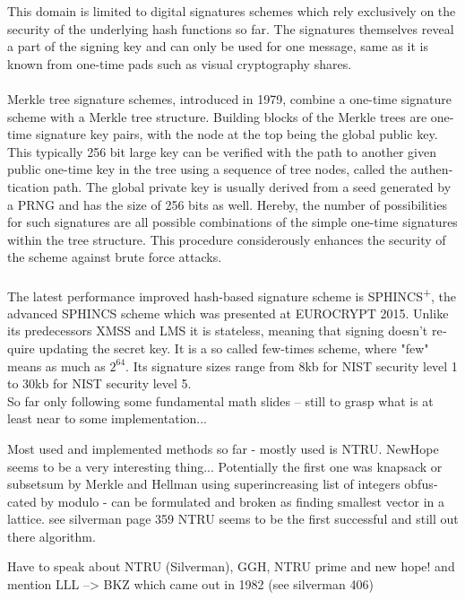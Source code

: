 \documentclass[a4paper,11pt,draft]{article}
\begin{document}
\begin{otherlanguage}{english}
\begin{multicols}{2}
This domain is limited to digital signatures schemes which rely exclusively on the security of the underlying hash functions so far. The signatures themselves reveal a part of the signing key and can only be used for one message, same as it is known from one-time pads such as visual cryptography shares. \\
\\
Merkle tree signature schemes, introduced in 1979, combine a one-time signature scheme with a Merkle tree structure. Building blocks of the Merkle trees are one-time signature key pairs, with the node at the top being the global public key. This typically 256 bit large key can be verified with the path to another given public one-time key in the tree using a sequence of tree nodes, called the authentication path. The global private key is usually derived from a seed generated by a PRNG and has the size of 256 bits as well.
Hereby, the number of possibilities for such signatures are all possible combinations of the simple one-time signatures within the tree structure. This procedure considerously enhances the security of the scheme against brute force attacks. \\
\\
The latest performance improved hash-based signature scheme is SPHINCS\textsuperscript{+}, the advanced SPHINCS scheme which was presented at EUROCRYPT 2015. Unlike its predecessors XMSS and LMS it is stateless, meaning that signing doesn't require updating the secret key. It is a so called few-times scheme, where "few" means as much as $2^{64}$. Its signature sizes range from 8kb for NIST security level 1 to 30kb for NIST security level 5.\\

 So far only following some fundamental math slides -- still to grasp what is at least near to some implementation... 

Most used and implemented methods so far - mostly used is NTRU. NewHope seems to be a very interesting thing...
Potentially the first one was knapsack or subsetsum by Merkle and Hellman using superincreasing list of integers obfuscated by modulo  - can be formulated and broken as finding smallest vector in a lattice. see silverman page 359
NTRU seems to be the first successful and still out there algorithm.

Have to speak about NTRU (Silverman), GGH, NTRU prime and new hope!  and mention LLL --> BKZ which came out in 1982 (see silverman 406)



\end{multicols}
\end{otherlanguage}
\end{document}
